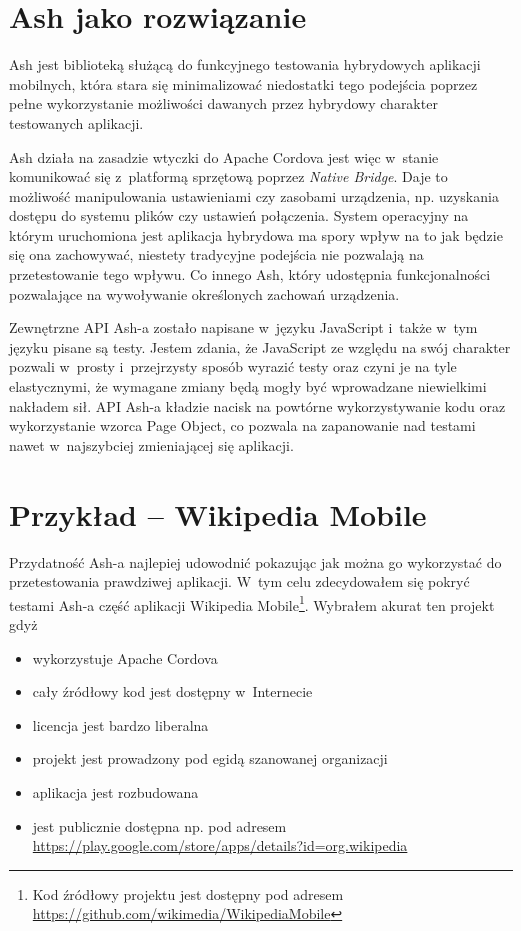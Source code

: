\documentclass[brudnopis]{xmgr}
\begin{document}
                                                                                                                                                                 
\section{Ash jako rozwiązanie}

Ash jest biblioteką służącą do funkcyjnego testowania hybrydowych aplikacji mobilnych, która stara się minimalizować niedostatki tego podejścia poprzez pełne wykorzystanie możliwości dawanych przez hybrydowy charakter testowanych aplikacji. 

Ash działa na zasadzie wtyczki do Apache Cordova jest więc w~stanie komunikować się z~platformą sprzętową poprzez \textit{Native Bridge}. Daje to możliwość manipulowania ustawieniami czy zasobami urządzenia, np. uzyskania dostępu do systemu plików czy ustawień połączenia. System operacyjny na którym uruchomiona jest aplikacja hybrydowa ma spory wpływ na to jak będzie się ona zachowywać, niestety tradycyjne podejścia nie pozwalają na przetestowanie tego wpływu. Co innego Ash, który udostępnia funkcjonalności pozwalające na wywoływanie określonych zachowań urządzenia. 

Zewnętrzne API Ash-a zostało napisane w~języku JavaScript i~także w~tym języku pisane są testy. Jestem zdania, że JavaScript ze względu na swój charakter pozwali w~prosty i~przejrzysty sposób wyrazić testy oraz czyni je na tyle elastycznymi, że wymagane zmiany będą mogły być wprowadzane niewielkimi nakładem sił. API Ash-a kładzie nacisk na powtórne wykorzystywanie kodu oraz wykorzystanie wzorca Page Object, co pozwala na zapanowanie nad testami nawet w~najszybciej zmieniającej się aplikacji. 

\section{Przykład -- Wikipedia Mobile}

Przydatność Ash-a najlepiej udowodnić pokazując jak można go wykorzystać do przetestowania prawdziwej aplikacji. W~tym celu zdecydowałem się pokryć testami Ash-a część aplikacji Wikipedia Mobile\footnote{Kod źródłowy projektu jest dostępny pod adresem \url{https://github.com/wikimedia/WikipediaMobile} }. Wybrałem akurat ten projekt gdyż

\begin{itemize}
  \item wykorzystuje Apache Cordova
  \item cały źródłowy kod jest dostępny w~Internecie
  \item licencja jest bardzo liberalna
  \item projekt jest prowadzony pod egidą szanowanej organizacji
  \item aplikacja jest rozbudowana
  \item jest publicznie dostępna np. pod adresem \url{https://play.google.com/store/apps/details?id=org.wikipedia}
\end{itemize}
\end{document}
